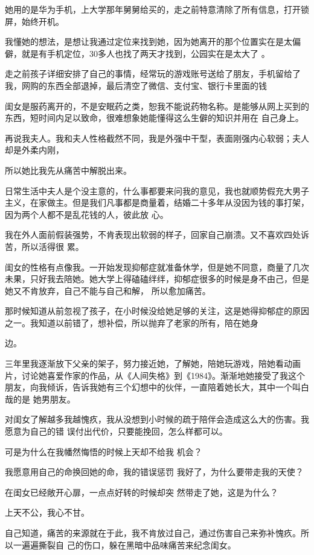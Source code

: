 \documentclass{article}
\begin{document}
她用的是华为手机，上大学那年舅舅给买的，走之前特意清除了所有信息，打开锁屏，始终开机。

我懂她的想法，是想让我通过定位来找到她，因为她离开的那个位置实在是太偏僻，就是有手机定位，30多人也找了两天才找到，公园实在是太大了
。 

走之前孩子详细安排了自己的事情，经常玩的游戏账号送给了朋友，手机留给了我，网购的东西全部退掉，最后清空了微信、支付宝、银行卡里面的钱

闺女是服药离开的，不是安眠药之类，恕我不能说药物名称。是能够从网上买到的东西，短时间内足以致命，很难想象她能懂得这么生僻的知识并用在
自己身上。 

再说我夫人。我和夫人性格截然不同，我是外强中干型，表面刚强内心软弱；夫人却是外柔内刚，

\newpage
所以她比我先从痛苦中解脱出来。 

日常生活中夫人是个没主意的，什么事都要来问我的意见，我也就顺势假充大男子主义，在家做主。但是我们凡事都是商量着，结婚二十多年从没因为钱的事打架，因为两个人都不是乱花钱的人，彼此放
心。 

我在外人面前假装强势，不肯表现出软弱的样子，回家自己崩溃。又不喜欢四处诉苦，所以活得很
累。 

闺女的性格有点像我。一开始发现抑郁症就准备休学，但是她不同意，商量了几次未果，只好我去陪她。她大学上得磕磕绊绊，抑郁症很多的时候是身不由己，但是她又不肯放弃，自己不能与自己和解，
所以愈加痛苦。 

那时候知道从前忽视了孩子，在小时候没给她足够的关注，这是她得抑郁症的原因之一。我知道以前错了，想补偿，所以抛弃了老家的所有，陪在她身

\newpage
边。 

三年里我逐渐放下父亲的架子，努力接近她，了解她，陪她玩游戏，陪她看动画片，讨论她喜爱作家的作品，从《人间失格》到《1984》。渐渐地她接受了我这个朋友，向我倾诉，告诉我她有三个幻想中的伙伴，一直陪着她长大，其中一个叫白哉的是
她男朋友。 

对闺女了解越多我越愧疚，我从没想到小时候的疏于陪伴会造成这么大的伤害。我愿意为自己的错
误付出代价，只要能挽回，怎么样都可以。 

可是为什么在我幡然悔悟的时候上天却不给我
机会？ 

我愿意用自己的命换回她的命，我的错误惩罚
我好了，为什么要带走我的天使？ 

在闺女已经敞开心扉，一点点好转的时候却突
然带走了她，这是为什么？ 

\newpage


上天不公，我心不甘。 

自己知道，痛苦的来源就在于此，我不肯放过自己，通过伤害自己来弥补愧疚。所以一遍遍撕裂自
己的伤口，躲在黑暗中品味痛苦来纪念闺女。 
\end{document}

